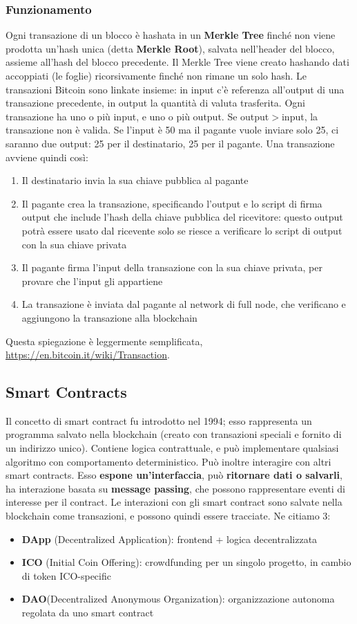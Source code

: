 \documentclass[11pt]{article}
\begin{document}
\subsubsection{Funzionamento}
Ogni transazione di un blocco è hashata in un \textbf{Merkle Tree} finché non viene prodotta un'hash unica (detta \textbf{Merkle Root}), salvata nell'header del blocco, assieme all'hash del blocco precedente. Il Merkle Tree viene creato hashando dati accoppiati (le foglie) ricorsivamente finché non rimane un solo hash. Le transazioni Bitcoin sono linkate insieme: in input c'è referenza all'output di una transazione precedente, in output la quantità di valuta trasferita. Ogni transazione ha uno o più input, e uno o più output. Se output$>$input, la transazione non è valida. Se l'input è 50 ma il pagante vuole inviare solo 25, ci saranno due output: 25 per il destinatario, 25 per il pagante. Una transazione avviene quindi così:
\begin{enumerate}
    \item Il destinatario invia la sua chiave pubblica al pagante
    \item Il pagante crea la transazione, specificando l'output e lo script di firma output che include l'hash della chiave pubblica del ricevitore: questo output potrà essere usato dal ricevente solo se riesce a verificare lo script di output con la sua chiave privata
    \item Il pagante firma l'input della transazione con la sua chiave privata, per provare che l'input gli appartiene
    \item La transazione è inviata dal pagante al network di full node, che verificano e aggiungono la transazione alla blockchain
\end{enumerate}
Questa spiegazione è leggermente semplificata, \href{questa merita una lettura}{https://en.bitcoin.it/wiki/Transaction}.
\subsection{Smart Contracts}
Il concetto di smart contract fu introdotto nel 1994; esso rappresenta un programma salvato nella blockchain (creato con transazioni speciali e fornito di un indirizzo unico). Contiene logica contrattuale, e può implementare qualsiasi algoritmo con comportamento deterministico. Può inoltre interagire con altri smart contracts. Esso \textbf{espone un'interfaccia}, può \textbf{ritornare dati o salvarli}, ha interazione basata su \textbf{message passing}, che possono rappresentare eventi di interesse per il contract. Le interazioni con gli smart contract sono salvate nella blockchain come transazioni, e possono quindi essere tracciate. Ne citiamo 3:
\begin{itemize}
    \item \textbf{DApp} (Decentralized Application): frontend + logica decentralizzata 
    \item \textbf{ICO} (Initial Coin Offering): crowdfunding per un singolo progetto, in cambio di token ICO-specific
    \item \textbf{DAO}(Decentralized Anonymous Organization): organizzazione autonoma regolata da uno smart contract
\end{itemize}
\end{document}
